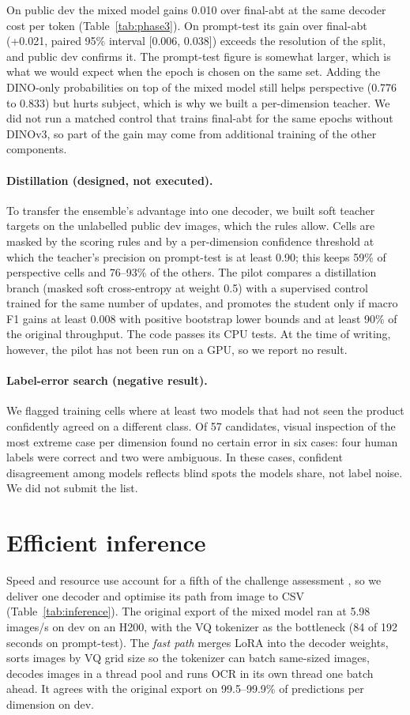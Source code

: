 \documentclass[11pt]{article}
\begin{document}
On public dev the mixed model gains 0.010 over final-abt at the same decoder cost per token (Table~\ref{tab:phase3}). On prompt-test its gain over final-abt (+0.021, paired 95\% interval [0.006, 0.038]) exceeds the resolution of the split, and public dev confirms it. The prompt-test figure is somewhat larger, which is what we would expect when the epoch is chosen on the same set. Adding the DINO-only probabilities on top of the mixed model still helps perspective (0.776 to 0.833) but hurts subject, which is why we built a per-dimension teacher. We did not run a matched control that trains final-abt for the same epochs without DINOv3, so part of the gain may come from additional training of the other components.

\paragraph{Distillation (designed, not executed).} To transfer the ensemble's advantage into one decoder, we built soft teacher targets on the unlabelled public dev images, which the rules allow. Cells are masked by the scoring rules and by a per-dimension confidence threshold at which the teacher's precision on prompt-test is at least 0.90; this keeps 59\% of perspective cells and 76--93\% of the others. The pilot compares a distillation branch (masked soft cross-entropy at weight 0.5) with a supervised control trained for the same number of updates, and promotes the student only if macro F1 gains at least 0.008 with positive bootstrap lower bounds and at least 90\% of the original throughput. The code passes its CPU tests. At the time of writing, however, the pilot has not been run on a GPU, so we report no result.

\paragraph{Label-error search (negative result).} We flagged training cells where at least two models that had not seen the product confidently agreed on a different class. Of 57 candidates, visual inspection of the most extreme case per dimension found no certain error in six cases: four human labels were correct and two were ambiguous. In these cases, confident disagreement among models reflects blind spots the models share, not label noise. We did not submit the list.

\section{Efficient inference}
\label{sec:inference}
Speed and resource use account for a fifth of the challenge assessment \cite{challenge}, so we deliver one decoder and optimise its path from image to CSV (Table~\ref{tab:inference}). The original export of the mixed model ran at 5.98 images/s on dev on an H200, with the VQ tokenizer as the bottleneck (84 of 192 seconds on prompt-test). The \emph{fast path} merges LoRA into the decoder weights, sorts images by VQ grid size so the tokenizer can batch same-sized images, decodes images in a thread pool and runs OCR in its own thread one batch ahead. It agrees with the original export on 99.5--99.9\% of predictions per dimension on dev.
\end{document}
